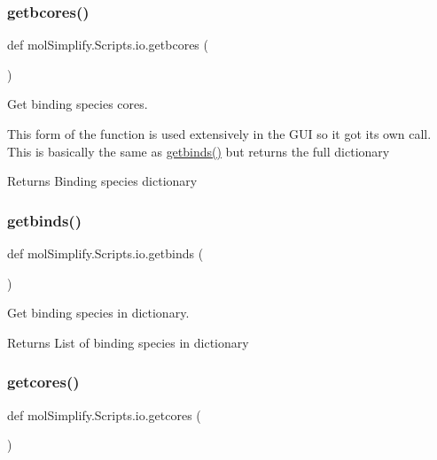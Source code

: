 \subsubsection{\texorpdfstring{getbcores()}{getbcores()}}
{\footnotesize\ttfamily def mol\+Simplify.\+Scripts.\+io.\+getbcores (\begin{DoxyParamCaption}{ }\end{DoxyParamCaption})}



Get binding species cores. 

This form of the function is used extensively in the G\+UI so it got it\textquotesingle{}s own call. This is basically the same as \hyperlink{namespacemolSimplify_1_1Scripts_1_1io_ae69fc7bad48abf6eb335f271eb1dd68c}{getbinds()} but returns the full dictionary \begin{DoxyReturn}{Returns}
Binding species dictionary 
\end{DoxyReturn}
\mbox{\label{namespacemolSimplify_1_1Scripts_1_1io_ae69fc7bad48abf6eb335f271eb1dd68c}} 
\subsubsection{\texorpdfstring{getbinds()}{getbinds()}}
{\footnotesize\ttfamily def mol\+Simplify.\+Scripts.\+io.\+getbinds (\begin{DoxyParamCaption}{ }\end{DoxyParamCaption})}



Get binding species in dictionary. 

\begin{DoxyReturn}{Returns}
List of binding species in dictionary 
\end{DoxyReturn}
\mbox{\label{namespacemolSimplify_1_1Scripts_1_1io_ac64e78f365020a88b30902f3b6aba5d2}} 
\subsubsection{\texorpdfstring{getcores()}{getcores()}}
{\footnotesize\ttfamily def mol\+Simplify.\+Scripts.\+io.\+getcores (\begin{DoxyParamCaption}{ }\end{DoxyParamCaption})}



